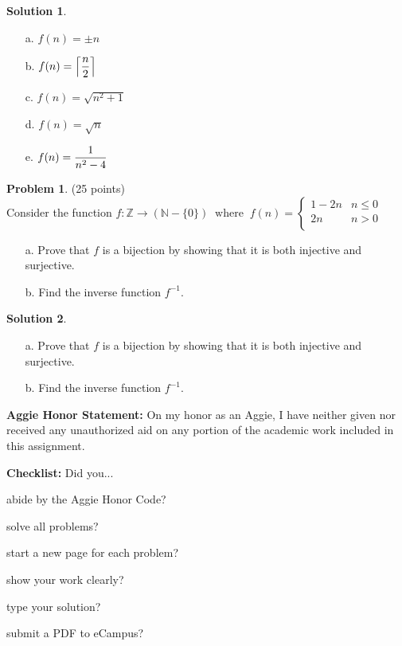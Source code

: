 \documentclass{article}
\theoremstyle{definition}
\newtheorem{problem}{Problem}
\newtheorem*{solution}{Solution}
\newcommand{\honor}{\noindent \textbf{Aggie Honor Statement: }On my honor as an Aggie, I have neither
  given nor received any unauthorized aid on any portion of the academic work included in this assignment.
}
\newcommand{\checklist}{\noindent\textbf{Checklist:}
Did you...
\begin{compactenum}
\item abide by the Aggie Honor Code?
\item solve all problems?
\item start a new page for each problem?
\item show your work clearly?
\item type your solution?
\item submit a PDF to eCampus?
\end{compactenum}
}
\begin{document}
\begin{solution}\ \\
  \begin{enumerate}
  \item[a.] $f(n) = \pm n$

  \item[b.] $\displaystyle f(n) = \left\lceil{n \over 2}\right\rceil$

  \item[c.] $f(n) = \sqrt{n^2+1}$

  \item[d.] $f(n) = \sqrt{n}$

  \item[e.] $\displaystyle f(n) = {1 \over n^2 - 4}$

  \end{enumerate}
\end{solution}

\newpage

\begin{problem} (25 points)\\
Consider the function $f: \mathbb{Z} \to (\mathbb{N}-\{0\})~\text{ where }~f(n) = \left\{
\begin{array}{ll}
1-2n & n \leq 0\\
2n & n > 0\\
\end{array}\right.$
\begin{enumerate}
\item[a.] Prove that $f$ is a bijection by showing that it is both injective and surjective.
\item[b.] Find the inverse function $f^{-1}$.
\end{enumerate}
\end{problem}

\begin{solution}\ \\
  \begin{enumerate}
  \item[a.] Prove that $f$ is a bijection by showing that it is both injective and surjective.

  \item[b.] Find the inverse function $f^{-1}$.

  \end{enumerate}
\end{solution}

\newpage

\bigskip
\honor

\bigskip
\checklist
\end{document}
